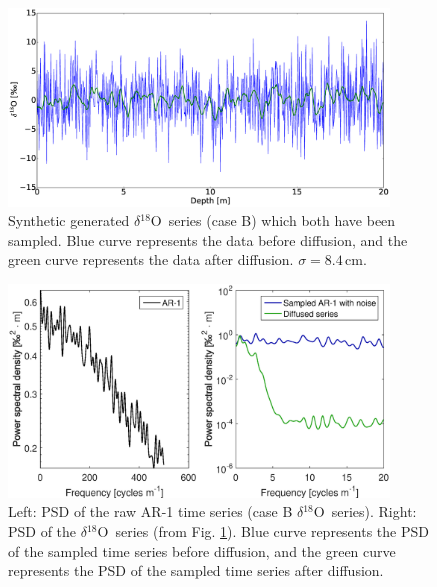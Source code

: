 \documentclass[11pt, draftcls, onecolumn]{IEEEtran} %
\numberwithin{equation}{section}
\numberwithin{table}{section}
\numberwithin{figure}{section}
\newcommand{\delOx}{$\delta{}^{18}\mathrm{O}$}
\begin{document}
\begin{appendices}
\begin{figure}[]
	\vspace*{2mm}
	\begin{center}
		\includegraphics[width=0.9\textwidth]{Figure_14}
		\caption{Synthetic generated \delOx~series (case B) which both have been sampled. Blue curve represents the data before
			diffusion, and the green curve represents the data after diffusion. $\sigma=8.4\,\mathrm{cm}$.}  \label{fig:appendix_synthetic_data}
	\end{center}
\end{figure}

\begin{figure}[]
	\vspace*{2mm}
	\begin{center}
		\includegraphics[width=0.9\textwidth]{Figure_15}
		\caption{Left: PSD of the raw AR-1 time series (case B \delOx~series). 
			Right: PSD of the \delOx~series (from Fig. \ref{fig:appendix_synthetic_data}). 
			Blue curve represents the PSD of the sampled time series before diffusion, 
			and the green curve represents the PSD of the sampled time series after diffusion. }  \label{fig:appendix_synthetic_PSD}
	\end{center}
\end{figure}



\end{appendices}
\end{document}
